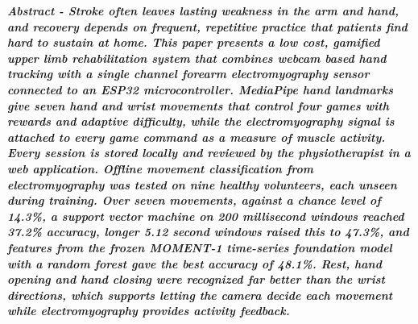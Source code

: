 \documentclass[10pt,a4paper,twocolumn]{article}
\begin{document}

\noindent\textbf{\textit{Abstract - Stroke often leaves lasting weakness in the arm and hand, and recovery depends on frequent, repetitive practice that patients find hard to sustain at home. This paper presents a low cost, gamified upper limb rehabilitation system that combines webcam based hand tracking with a single channel forearm electromyography sensor connected to an ESP32 microcontroller. MediaPipe hand landmarks give seven hand and wrist movements that control four games with rewards and adaptive difficulty, while the electromyography signal is attached to every game command as a measure of muscle activity. Every session is stored locally and reviewed by the physiotherapist in a web application. Offline movement classification from electromyography was tested on nine healthy volunteers, each unseen during training. Over seven movements, against a chance level of 14.3\%, a support vector machine on 200 millisecond windows reached 37.2\% accuracy, longer 5.12 second windows raised this to 47.3\%, and features from the frozen MOMENT-1 time-series foundation model with a random forest gave the best accuracy of 48.1\%. Rest, hand opening and hand closing were recognized far better than the wrist directions, which supports letting the camera decide each movement while electromyography provides activity feedback.}}
\end{document}
